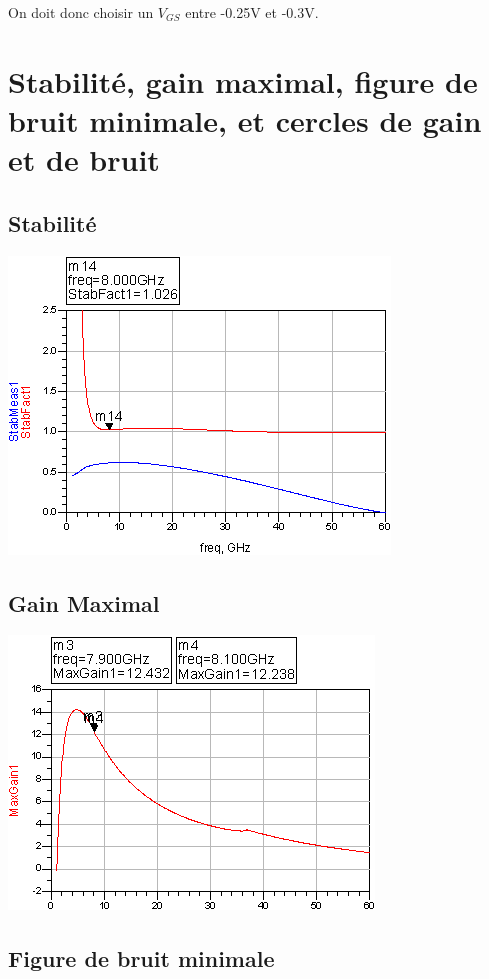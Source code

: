 \documentclass{article}
\begin{document}
\begin{centering}
On doit donc choisir un $V_{GS}$ entre -0.25V et -0.3V.

\newpage
\section{Stabilité, gain maximal, figure de bruit minimale, et cercles de gain et de bruit}
\subsection{Stabilité}

\includegraphics{stab.png}

\subsection{Gain Maximal}

\includegraphics{gain.png}

\subsection{Figure de bruit minimale}


\end{centering}
\end{document}
